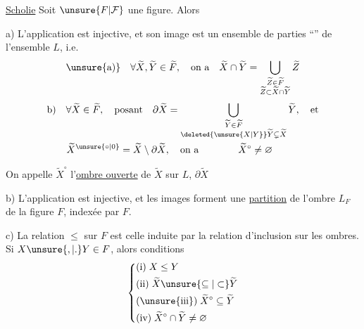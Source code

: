 \uline{Scholie}  Soit $\unsure{F|\mathcal F}$ une figure. Alors

a) L'application
est injective, et son image  est un ensemble de parties ``'' de l'ensemble $L$, i.e.
\[
\text{\unsure{a)}}\quad\forall\widetilde X,\widetilde Y\in\widetilde F,\quad\text{on a}\quad
\widetilde X\cap\widetilde Y=\bigcup_{\substack{\widetilde Z\in\widetilde F\\ \widetilde Z\subset\widetilde X\cap\widetilde Y}}\widetilde Z
\]
\[
\begin{aligned}
&\text{b)}\quad \forall\widetilde X\in\widetilde F,\quad\text{posant}\quad
\partial\widetilde X=\bigcup_{\substack{\widetilde Y\in\widetilde F\\ \deleted{\unsure{X|Y}}\widetilde Y\subsetneq\widetilde X}}\widetilde Y,\quad\text{et}\\
&\qquad\widetilde X^{\unsure{\circ|0}}=\widetilde X\setminus\partial\widetilde X,\quad\text{on a}\qquad\qquad \widetilde X^\circ\neq\varnothing
\end{aligned}
\]

On  appelle $\widetilde X^\circ$ l'\uline{ombre ouverte} de $\widetilde X$ sur $L$, $\partial\widetilde X$  

b) L'application
est injective, et  les images forment une \uline{partition} de l'ombre $L_F$ de la figure $F$, indexée par $F$.

c)  La relation $\leq$ sur $F$ est celle induite par la relation d'inclusion sur les ombres. Si $X\unsure{,|.}Y\in F$, alors conditions 
\[
\left\{\begin{aligned}
&\text{(i)}\;X\leq Y\\
&\text{(ii)}\;\widetilde X\unsure{\subseteq|\subset}\widetilde Y\\
&\text{(\unsure{iii})}\;\widetilde X^\circ\subseteq\widetilde Y\\
&\text{(iv)}\;\widetilde X^\circ\cap\widetilde Y\neq\varnothing
\end{aligned}\right.
\]
